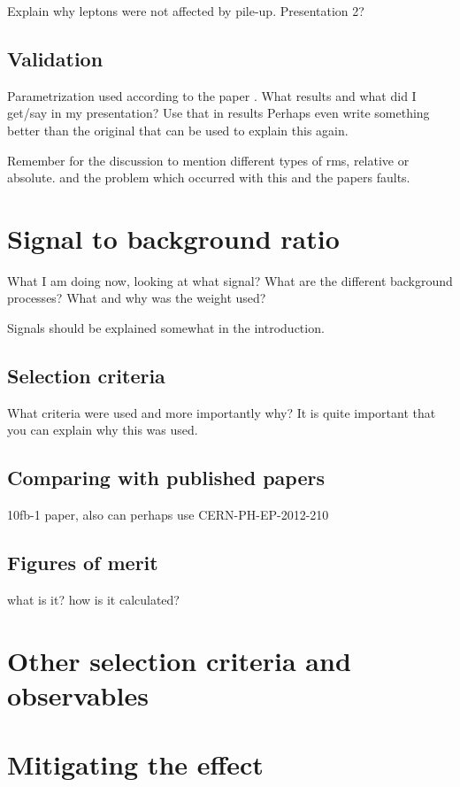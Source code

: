 Explain why leptons were not affected by pile-up. Presentation 2?

\subsection{Validation}
Parametrization used according to the paper \citep{ATL-PHYS-PUB-2013-004}. What results and what did I get/say in my presentation? Use that in results Perhaps even write something better than the original that can be used to explain this again.

Remember for the discussion to mention different types of rms, relative or absolute. and the problem which occurred with this and the papers faults.

\section{Signal to background ratio}
What I am doing now, looking at what signal? What are the different background processes? What and why was the weight used?

Signals should be explained somewhat in the introduction.
 
\subsection{Selection criteria}
What criteria were used and more importantly why? It is quite important that you can explain why this was used.

\subsection{Comparing with published papers} 	
10fb-1 paper, also can perhaps use CERN-PH-EP-2012-210
\subsection{Figures of merit}
what is it? how is it calculated?
\section{Other selection criteria and observables}
\section{Mitigating the effect}